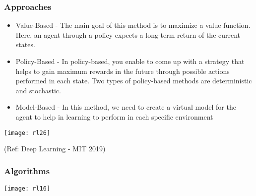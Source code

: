 \begin{frame}[fragile]\frametitle{Approaches}

\begin{itemize}
\item Value-Based - The main goal of this method is to maximize a value function. Here, an agent through a policy expects a long-term return of the current states.

\item Policy-Based - In policy-based, you enable to come up with a strategy that helps to gain maximum rewards in the future through possible actions performed in each state. Two types of policy-based methods are deterministic and stochastic.

\item Model-Based - In this method, we need to create a virtual model for the agent to help in learning to perform in each specific environment
\end{itemize}

\begin{center}
\texttt{[image: rl26]}
\end{center}

{\tiny (Ref: Deep Learning - MIT 2019)}

\end{frame}

\begin{frame}[fragile]\frametitle{Algorithms}

\begin{center}
\texttt{[image: rl16]}
\end{center}

\end{frame}






